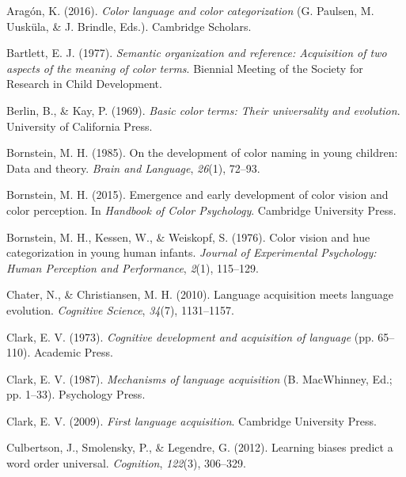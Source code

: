 \documentclass[
  ,apa7,floatsintext]{apa6}
\newlength{\cslhangindent}
\newlength{\cslentryspacingunit} %
\newenvironment{CSLReferences}[2] %
 {%
  \setlength{\parindent}{0pt}
  \ifodd #1
  \let\oldpar\par
  \def\par{\hangindent=\cslhangindent\oldpar}
  \fi
  \setlength{\parskip}{#2\cslentryspacingunit}
 }%
 {}
\begin{document}
\hypertarget{refs}{}
\begin{CSLReferences}{1}{0}
\leavevmode{}%
Aragón, K. (2016). \emph{Color language and color categorization} (G. Paulsen, M. Uusküla, \& J. Brindle, Eds.). Cambridge Scholars.

\leavevmode{}%
Bartlett, E. J. (1977). \emph{Semantic organization and reference: Acquisition of two aspects of the meaning of color terms}. Biennial Meeting of the Society for Research in Child Development.

\leavevmode{}%
Berlin, B., \& Kay, P. (1969). \emph{Basic color terms: Their universality and evolution}. University of California Press.

\leavevmode{}%
Bornstein, M. H. (1985). On the development of color naming in young children: Data and theory. \emph{Brain and Language}, \emph{26}(1), 72--93.

\leavevmode{}%
Bornstein, M. H. (2015). Emergence and early development of color vision and color perception. In \emph{Handbook of {C}olor {P}sychology}. Cambridge University Press.

\leavevmode{}%
Bornstein, M. H., Kessen, W., \& Weiskopf, S. (1976). Color vision and hue categorization in young human infants. \emph{Journal of Experimental Psychology: Human Perception and Performance}, \emph{2}(1), 115--129.

\leavevmode{}%
Chater, N., \& Christiansen, M. H. (2010). Language acquisition meets language evolution. \emph{Cognitive Science}, \emph{34}(7), 1131--1157.

\leavevmode{}%
Clark, E. V. (1973). \emph{Cognitive development and acquisition of language} (pp. 65--110). Academic Press.

\leavevmode{}%
Clark, E. V. (1987). \emph{Mechanisms of language acquisition} (B. MacWhinney, Ed.; pp. 1--33). Psychology Press.

\leavevmode{}%
Clark, E. V. (2009). \emph{First language acquisition}. Cambridge University Press.

\leavevmode{}%
Culbertson, J., Smolensky, P., \& Legendre, G. (2012). Learning biases predict a word order universal. \emph{Cognition}, \emph{122}(3), 306--329.


\end{CSLReferences}
\end{document}
